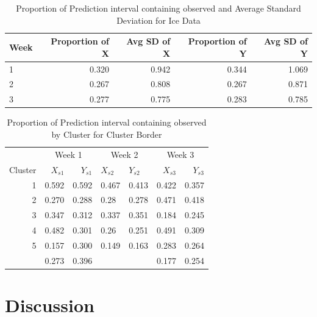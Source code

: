 \documentclass[12pt]{article}
\begin{document}
\begin{table}

\caption{\label{tab:cp-table-border}Proportion of Prediction interval containing observed and Average Standard Deviation for Ice Data}
\centering
\begin{tabular}[t]{lrrrr}
\toprule
Week & Proportion of X & Avg SD of X & Proportion of Y & Avg SD of Y\\
\midrule
1 & 0.320 & 0.942 & 0.344 & 1.069\\
2 & 0.267 & 0.808 & 0.267 & 0.871\\
3 & 0.277 & 0.775 & 0.283 & 0.785\\
\bottomrule
\end{tabular}
\end{table}

\begin{table}

\caption{\label{tab:cp-table-border-clust}Proportion of Prediction interval containing observed by Cluster for Cluster Border}
\centering
\begin{tabular}[t]{rrrllrr}
\toprule
\multicolumn{1}{c}{ } & \multicolumn{2}{c}{Week 1} & \multicolumn{2}{c}{Week 2} & \multicolumn{2}{c}{Week 3} \\
\cmidrule(l{3pt}r{3pt}){2-3} \cmidrule(l{3pt}r{3pt}){4-5} \cmidrule(l{3pt}r{3pt}){6-7}
Cluster & $X_{s1}$ & $Y_{s1}$ & $X_{s2}$ & $Y_{s2}$ & $X_{s3}$ & $Y_{s3}$\\
\midrule
1 & 0.592 & 0.592 & 0.467 & 0.413 & 0.422 & 0.357\\
2 & 0.270 & 0.288 & 0.28 & 0.278 & 0.471 & 0.418\\
3 & 0.347 & 0.312 & 0.337 & 0.351 & 0.184 & 0.245\\
4 & 0.482 & 0.301 & 0.26 & 0.251 & 0.491 & 0.309\\
5 & 0.157 & 0.300 & 0.149 & 0.163 & 0.283 & 0.264\\
\addlinespace
6 & 0.273 & 0.396 &  &  & 0.177 & 0.254\\
\bottomrule
\end{tabular}
\end{table}

\hypertarget{discussion}{%
\section{Discussion}\label{discussion}}
\end{document}
